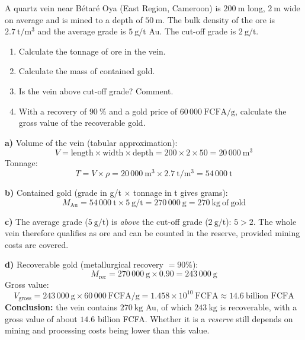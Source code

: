 \documentclass[11pt]{article}
\begin{document}
\begin{exoresolu}
A quartz vein near B\'etar\'e Oya (East Region, Cameroon) is $200\ \mathrm{m}$ long, $2\ \mathrm{m}$ wide on average and is mined to a depth of $50\ \mathrm{m}$. The bulk density of the ore is $2.7\ \mathrm{t/m^3}$ and the average grade is $5\ \mathrm{g/t}$ Au. The cut-off grade is $2\ \mathrm{g/t}$.
\begin{enumerate}
\item[a)] Calculate the tonnage of ore in the vein.
\item[b)] Calculate the mass of contained gold.
\item[c)] Is the vein above cut-off grade? Comment.
\item[d)] With a recovery of $90\ \%$ and a gold price of $60\,000\ \mathrm{FCFA/g}$, calculate the gross value of the recoverable gold.
\end{enumerate}
\tcblower
\textbf{a)} Volume of the vein (tabular approximation):
\[
V = \text{length} \times \text{width} \times \text{depth} = 200 \times 2 \times 50 = 20\,000\ \mathrm{m^3}
\]
Tonnage:
\[
T = V \times \rho = 20\,000\ \mathrm{m^3} \times 2.7\ \mathrm{t/m^3} = 54\,000\ \mathrm{t}
\]

\textbf{b)} Contained gold (grade in g/t $\times$ tonnage in t gives grams):
\[
M_{\mathrm{Au}} = 54\,000\ \mathrm{t} \times 5\ \mathrm{g/t} = 270\,000\ \mathrm{g} = 270\ \mathrm{kg\ of\ gold}
\]

\textbf{c)} The average grade ($5\ \mathrm{g/t}$) is \emph{above} the cut-off grade ($2\ \mathrm{g/t}$): $5 > 2$. The whole vein therefore qualifies as ore and can be counted in the reserve, provided mining costs are covered.

\textbf{d)} Recoverable gold (metallurgical recovery $= 90\%$):
\[
M_{\mathrm{rec}} = 270\,000\ \mathrm{g} \times 0.90 = 243\,000\ \mathrm{g}
\]
Gross value:
\[
V_{\mathrm{gross}} = 243\,000\ \mathrm{g} \times 60\,000\ \mathrm{FCFA/g} = 1.458 \times 10^{10}\ \mathrm{FCFA} \approx 14.6\ \text{billion FCFA}
\]
\textbf{Conclusion:} the vein contains $270\ \mathrm{kg}$ Au, of which $243\ \mathrm{kg}$ is recoverable, with a gross value of about $14.6$ billion FCFA. Whether it is a \emph{reserve} still depends on mining and processing costs being lower than this value.
\end{exoresolu}
\end{document}
